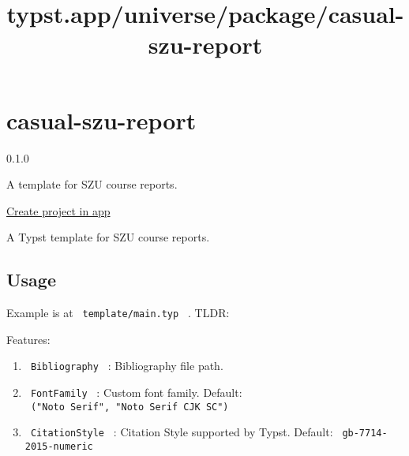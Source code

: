 \title{typst.app/universe/package/casual-szu-report}

\label{banner}
\label{template-thumbnail}

\section{casual-szu-report}\label{casual-szu-report}

{ 0.1.0 }

A template for SZU course reports.

\href{/app?template=casual-szu-report&version=0.1.0}{Create project in
app}

\label{readme}
A Typst template for SZU course reports.

\subsection{Usage}\label{usage}

Example is at \texttt{\ template/main.typ\ } . TLDR:

\begin{Shaded}
\begin{Highlighting}[]

\NormalTok{  ),}
\NormalTok{)}
\end{Highlighting}
\end{Shaded}

Features:

\begin{enumerate}
\tightlist
\item
  \texttt{\ Bibliography\ } : Bibliography file path.
\item
  \texttt{\ FontFamily\ } : Custom font family. Default:
  \texttt{\ ("Noto\ Serif",\ "Noto\ Serif\ CJK\ SC")\ }
\item
  \texttt{\ CitationStyle\ } : Citation Style supported by Typst.
  Default: \texttt{\ gb-7714-2015-numeric\ }
\end{enumerate}


